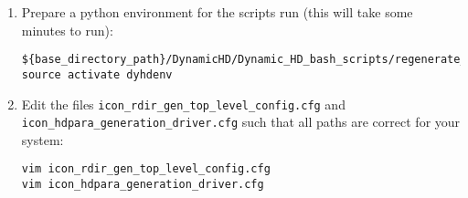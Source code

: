 \documentclass{article}
\begin{document}
\begin{enumerate}
\begin{lstlisting}[style=bash_input,breaklines=true]
cd hdpara_gen_workdir 
scp username@login1.mpimet.mpg.de:/home/mpim/m300468/mk_ic_rdirs/cell_numbers_r2bX.nc $(pwd)
scp username@login1.mpimet.mpg.de:/home/mpim/m300468/mk_ic_rdirs/icon_rdir_gen_top_level_config.cfg $(pwd)
scp username@login1.mpimet.mpg.de:/home/mpim/m300468/mk_ic_rdirs/icon_hdpara_generation_driver.cfg $(pwd)
scp username@login1.mpimet.mpg.de:/home/mpim/m300468/mk_ic_rdirs/corrected_orog_intermediary_ICE5G_and_tarasov_upscaled_srtm30plus_north_america_only_data_ALG4_sinkless_glcc_olson_lsmask_0k_20170517_003802.nc $(pwd)
scp username@login1.mpimet.mpg.de:/home/mpim/m300468/mk_ic_rdirs/rdirs_hydrosheds_au_af_sa_upscaled_10min_20200203_163646.nc $(pwd) 
\end{lstlisting}
\item Prepare a python environment for the scripts run (this will take some minutes to run):
\begin{lstlisting}[style=bash_input,breaklines=true]
${base_directory_path}/DynamicHD/Dynamic_HD_bash_scripts/regenerate_conda_environment.sh 
source activate dyhdenv
\end{lstlisting}
\item Edit the files \lstinline[style=bash_input]{icon_rdir_gen_top_level_config.cfg} and \lstinline[style=bash_input]{icon_hdpara_generation_driver.cfg} such that all paths are correct for your system:

\begin{lstlisting}[style=bash_input,breaklines=true]
vim icon_rdir_gen_top_level_config.cfg
vim icon_hdpara_generation_driver.cfg 
\end{lstlisting}


\end{enumerate}
\end{document}
